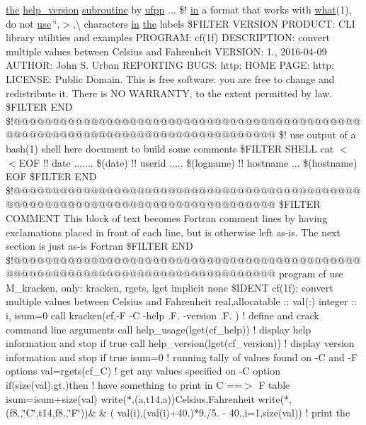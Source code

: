 \hyperlink{M__stopwatch_83_8txt_a0f266597de2e57eb3aa964927bb30e14}{the} \hyperlink{xauth__key_8f90_ad2aaabc58e93e13e8a0d5acf843eb5d0}{help\+\_\+version} \hyperlink{M__stopwatch_83_8txt_acfbcff50169d691ff02d4a123ed70482}{subroutine} by \hyperlink{ufpp_8f90_ae38e75311f766ddb27e1389ad1e8f7cc}{ufpp} ... \$! \hyperlink{M__journal_83_8txt_afce72651d1eed785a2132bee863b2f38}{in} a format that works with \hyperlink{what__overview_81_8txt_a8cdf8efd1b900d6dce77a3f97edb2216}{what}(1), do not \hyperlink{intro__blas1_83_8txt_a04fa2694d85f67a675bb3f45f7241f48}{use} \char`\"{},$>$,\textbackslash{} characters \hyperlink{M__journal_83_8txt_afce72651d1eed785a2132bee863b2f38}{in} \hyperlink{M__stopwatch_83_8txt_a0f266597de2e57eb3aa964927bb30e14}{the} labels \$F\+I\+L\+T\+ER V\+E\+R\+S\+I\+ON P\+R\+O\+D\+U\+C\+T\+: C\+LI library utilities and examples P\+R\+O\+G\+R\+A\+M\+: cf(1f) D\+E\+S\+C\+R\+I\+P\+T\+I\+O\+N\+: convert multiple values between Celsius and Fahrenheit V\+E\+R\+S\+I\+O\+N\+: 1., 2016-\/04-\/09 A\+U\+T\+H\+O\+R\+: John S. Urban R\+E\+P\+O\+R\+T\+I\+N\+G B\+U\+G\+S\+: http\+: H\+O\+M\+E P\+A\+G\+E\+: http\+: L\+I\+C\+E\+N\+S\+E\+: Public Domain. This is free software\+: you are free to change and redistribute it. There is N\+O W\+A\+R\+R\+A\+N\+T\+Y, to the extent permitted by law. \$\+F\+I\+L\+T\+E\+R E\+N\+D \$!@@@@@@@@@@@@@@@@@@@@@@@@@@@@@@@@@@@@@@@@@@@@@@@@@@@@@@@@@@@@@@@@@@@@@@@@@@@@@@@@ \$! use output of a bash(1) shell here document to build some comments \$\+F\+I\+L\+T\+E\+R S\+H\+E\+L\+L cat $<$$<$\+E\+O\+F !! date ....... \$(date) !! userid ..... \$(logname) !! hostname ... \$(hostname) E\+O\+F \$\+F\+I\+L\+T\+E\+R E\+N\+D \$!@@@@@@@@@@@@@@@@@@@@@@@@@@@@@@@@@@@@@@@@@@@@@@@@@@@@@@@@@@@@@@@@@@@@@@@@@@@@@@@@ \$\+F\+I\+L\+T\+E\+R C\+O\+M\+M\+E\+N\+T This block of text becomes Fortran comment lines by having exclamations placed in front of each line, but is otherwise left as-\/is. The next section is just as-\/is Fortran \$\+F\+I\+L\+T\+E\+R E\+N\+D \$!@@@@@@@@@@@@@@@@@@@@@@@@@@@@@@@@@@@@@@@@@@@@@@@@@@@@@@@@@@@@@@@@@@@@@@@@@@@@@@@@ program cf use M\+\_\+kracken, only\+: kracken, rgets, lget implicit none \$\+I\+D\+E\+N\+T cf(1f)\+: convert multiple values between Celsius and Fahrenheit real,allocatable \+:: val(\+:) integer \+:: i, isum=0 call kracken(\textquotesingle{}cf\textquotesingle{},\textquotesingle{}-\/\+F -\/\+C -\/help .\+F. -\/version .\+F.\textquotesingle{} ) ! define and crack command line arguments call help\+\_\+usage(lget(\textquotesingle{}cf\+\_\+help\textquotesingle{})) ! display help information and stop if true call help\+\_\+version(lget(\textquotesingle{}cf\+\_\+version\textquotesingle{})) ! display version information and stop if true isum=0 ! running tally of values found on -\/\+C and -\/\+F options val=rgets(\textquotesingle{}cf\+\_\+\+C\textquotesingle{}) ! get any values specified on -\/\+C option if(size(val).\+gt.)then ! have something to print in C ==$>$ F table isum=isum+size(val) write($\ast$,\textquotesingle{}(a,t14,a)\textquotesingle{})\textquotesingle{}\+Celsius\textquotesingle{},\textquotesingle{}\+Fahrenheit\textquotesingle{} write($\ast$,\textquotesingle{}(f8.,\char`\"{}\+C\char`\"{},t14,f8.,\char`\"{}\+F\char`\"{})\textquotesingle{})\& \& ( val(i),(val(i)+40.)$\ast$9./5. -\/ 40.,i=1,size(val)) ! print the 